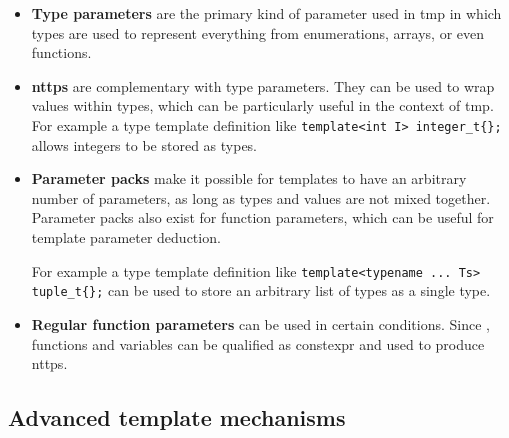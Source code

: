 \documentclass[../main]{subfiles}
\begin{document}
\begin{itemize}

  \item

\textbf{Type parameters} are the primary kind of parameter used in \gls{tmp}
in which types are used to represent everything from enumerations, arrays,
or even functions.

  \item

\textbf{\glspl{nttp}} are complementary with type parameters.
They can be used to wrap values within types, which can be particularly useful
in the context of \gls{tmp}. For example a type template definition like
\lstinline|template<int I> integer_t{};| allows integers to be stored as types.

  \item

\textbf{Parameter packs} make it possible for templates to have an
arbitrary number of parameters, as long as types and values
are not mixed together. Parameter packs also exist for function parameters,
which can be useful for template parameter deduction.

For example a type template definition like
\lstinline|template<typename ... Ts> tuple_t{};| can be used to store an
arbitrary list of types as a single type.

  \item

\textbf{Regular function parameters} can be used in certain conditions.
Since , functions and variables can be qualified as \gls{constexpr}
and used to produce \glspl{nttp}.

\end{itemize}

\subsection{
  Advanced \cpp template mechanisms
}
\end{document}
